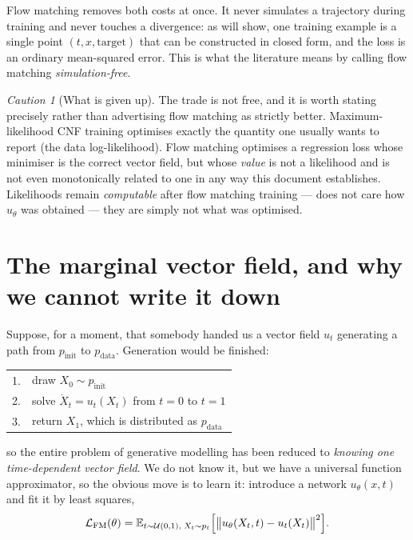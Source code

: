 \documentclass[11pt,a4paper]{report}
\theoremstyle{definition}
\theoremstyle{remark}
\newtheorem{caution}[caution]{Caution}
\newcommand{\EE}{\mathbb E}
\begin{document}
Flow matching removes both costs at once. It never simulates a trajectory
during training and never touches a divergence: as 
will show, one training example is a single point $(t,x,\text{target})$
that can be constructed in closed form, and the loss is an ordinary
mean-squared error. This is what the literature means by calling flow
matching \emph{simulation-free}.

\begin{caution}[What is given up]
\label{caution:fm-vs-mle}
The trade is not free, and it is worth stating precisely rather than
advertising flow matching as strictly better. Maximum-likelihood CNF
training optimises exactly the quantity one usually wants to report (the
data log-likelihood). Flow matching optimises a regression loss whose
minimiser is the correct vector field, but whose \emph{value} is not a
likelihood and is not even monotonically related to one in any way this
document establishes. Likelihoods remain \emph{computable} after flow
matching training ---  does not care how
$u_\theta$ was obtained --- they are simply not what was optimised.
\end{caution}

\section{The marginal vector field, and why we cannot write it down}
\label{sec:fm-marginal-problem}

Suppose, for a moment, that somebody handed us a vector field $u_t$
generating a path from $p_{\mathrm{init}}$ to $p_{\mathrm{data}}$.
Generation would be finished:

\begin{center}
\begin{tabular}{rl}
1. & draw $X_0\sim p_{\mathrm{init}}$ \\
2. & solve $\dot X_t = u_t(X_t)$ from $t=0$ to $t=1$ \\
3. & return $X_1$, which is distributed as $p_{\mathrm{data}}$ \\
\end{tabular}
\end{center}

so the entire problem of generative modelling has been reduced to
\emph{knowing one time-dependent vector field}. We do not know it, but we
have a universal function approximator, so the obvious move is to learn it:
introduce a network $u_\theta(x,t)$ and fit it by least squares,
\begin{equation}
\label{eq:fm-loss-ideal}
\mathcal L_{\mathrm{FM}}(\theta)
=
\EE_{t\sim\mathcal U(0,1),\;X_t\sim p_t}
\Bigl[\bigl\|u_\theta(X_t,t)-u_t(X_t)\bigr\|^2\Bigr] .
\end{equation}
\end{document}
